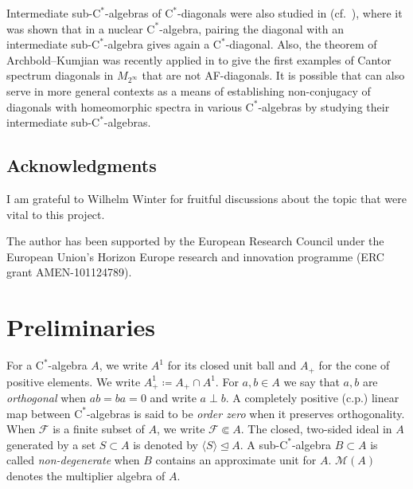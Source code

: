 \documentclass[11pt,a4paper]{amsart}
\theoremstyle{definition}
\numberwithin{equation}{section}
\newcommand{\mc}[1]{\mathcal{#1}}
\begin{document}
Intermediate sub-$\mathrm{C}^\ast$-algebras of $\mathrm{C}^\ast$-diagonals were also studied in \cite{BrownExelFullerPittsReznikoff21, BrownExelFullerPittsReznikoff21corrigendum} (cf.\ \cite{Komura22}), where it was shown that in a nuclear $\mathrm{C}^\ast$-algebra, pairing the diagonal with an intermediate sub-$\mathrm{C}^\ast$-algebra gives again a $\mathrm{C}^\ast$-diagonal. Also, the theorem of Archbold--Kumjian was recently applied in \cite{KopWin26} to give the first examples of Cantor spectrum diagonals in $M_{2^\infty}$ that are not AF-diagonals. It is possible that  can also serve in more general contexts as a means of establishing non-conjugacy of diagonals with homeomorphic spectra in various $\mathrm{C}^\ast$-algebras by studying their intermediate sub-$\mathrm{C}^\ast$-algebras.


\subsection*{Acknowledgments}
I am grateful to Wilhelm Winter for fruitful discussions about the topic that were vital to this project.

The author has been supported by the European Research Council under the European Union's Horizon Europe research and innovation programme (ERC grant AMEN-101124789).

\section{Preliminaries}
\noindent For a $\mathrm{C}^\ast$-algebra $A$, we write $A^1$ for its closed unit ball and $A_+$ for the cone of positive elements. We write $A_+^1\coloneqq A_+\cap A^1$. For $a,b\in A$ we say that $a,b$ are \emph{orthogonal} when $ab=ba=0$ and write $a\perp b$. A completely positive (c.p.) linear map between $\mathrm{C}^\ast$-algebras is said to be \emph{order zero} when it preserves orthogonality. When $\mc{F}$ is a finite subset of $A$, we write $\mc{F}\Subset A$. The closed, two-sided ideal in $A$ generated by a set $S\subset A$ is denoted by $\langle S\rangle\trianglelefteq A$. A sub-$\mathrm{C}^\ast$-algebra $B\subset A$ is called \emph{non-degenerate} when $B$ contains an approximate unit for $A$. $\mc{M}(A)$ denotes the multiplier algebra of $A$.
\end{document}
